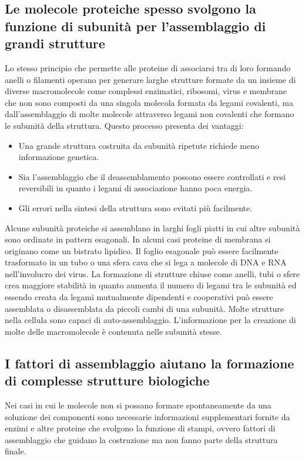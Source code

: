 \subsection{Le molecole proteiche spesso svolgono la funzione di subunit\`a per l'assemblaggio di grandi strutture}
Lo stesso principio che permette alle proteine di associarsi tra di loro formando anelli o filamenti operano per generare larghe strutture formate da un insieme di diverse macromolecole
come complessi enzimatici, ribosomi, virus e membrane che non sono composti da una singola molecola formata da legami covalenti, ma dall'assemblaggio di molte molecole attraverso legami
non covalenti che formano le subunit\`a della struttura. Questo processo presenta dei vantaggi:
\begin{itemize}
	\item Una grande struttura costruita da subunit\`a ripetute richiede meno informazione genetica.
	\item Sia l'assemblaggio che il deassemblamento  possono essere controllati e resi reversibili in quanto i legami di associazione hanno poca energia.
	\item Gli errori nella sintesi della struttura sono evitati pi\`u facilmente. 
\end{itemize}
Alcune subunit\`a proteiche si assemblano in larghi fogli piatti in cui altre subunit\`a sono ordinate in pattern esagonali. In alcuni casi proteine di membrana si originano come un
bistrato lipidico. Il foglio esagonale pu\`o essere facilmente trasformato in un tubo o una sfera cava che si lega a molecole di DNA e RNA nell'involucro dei virus. La formazione
di strutture chiuse come anelli, tubi o sfere crea maggiore stabilit\`a in quanto aumenta il numero di legami tra le subunit\`a ed essendo creata da legami mutualmente dipendenti e 
cooperativi pu\`o essere assemblata o disassemblata da piccoli cambi di una subunit\`a. Molte strutture nella cellula sono capaci di auto-assemblaggio. L'informazione per la creazione di
molte delle macromolecole \`e contenuta nelle subunit\`a stesse. 
\subsection{I fattori di assemblaggio aiutano la formazione di complesse strutture biologiche}
Nei casi in cui le molecole non si possano formare spontaneamente da una soluzione dei componenti sono necessarie informazioni supplementari fornite da enzimi e altre proteine che 
svolgono la funzione di stampi, ovvero fattori di assemblaggio che guidano la costruzione ma non fanno parte della struttura finale. 
